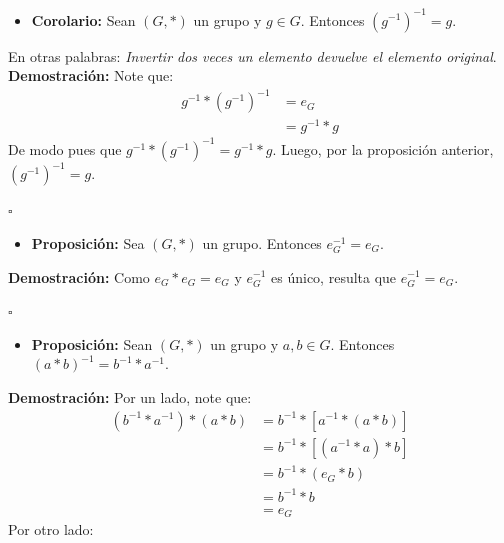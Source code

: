 \documentclass[10 pt]{article}
\begin{document}
\begin{itemize}
    \item \Large{\textbf{Corolario:} Sean $(G,*)$ un grupo y $g \in G$. Entonces $(g^{-1})^{-1}=g$.} \\
\end{itemize}

\Large{En otras palabras: \textit{Invertir dos veces un elemento devuelve el elemento original}.} \\

\Large{\textbf{Demostración:} Note que:}
\begin{align*}
    g^{-1}*(g^{-1})^{-1}&=e_G \\
    &=g^{-1} *g 
\end{align*}
\Large{De modo pues que $g^{-1}*(g^{-1})^{-1}=g^{-1}*g$. Luego, por la proposición anterior, $(g^{-1})^{-1}=g$.} \\

\begin{flushright}
    $\square$
\end{flushright}

\begin{itemize}
    \item \Large{\textbf{Proposición:} Sea $(G,*)$ un grupo. Entonces $e_G^{-1}=e_G$.} \\
\end{itemize}

\Large{\textbf{Demostración:} Como $e_G*e_G=e_G$ y $e_G^{-1}$ es único, resulta que $e_G^{-1}=e_G$.}

\begin{flushright}
    $\square$
\end{flushright}

\begin{itemize}
    \item \Large{\textbf{Proposición:} Sean $(G,*)$ un grupo y $a,b \in G$. Entonces $(a*b)^{-1}=b^{-1}*a^{-1}$.} \\
\end{itemize}

\Large{\textbf{Demostración:} Por un lado, note que:}
\begin{align*}
    (b^{-1}*a^{-1})*(a*b)&=b^{-1}*[a^{-1}*(a*b)] \\
    &=b^{-1}*[(a^{-1}*a)*b] \\
    &=b^{-1}*(e_G*b) \\
    &=b^{-1}*b \\
    &=e_G
\end{align*}
\Large{Por otro lado:}
\end{document}
